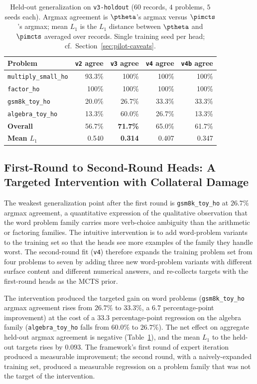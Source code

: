 \begin{table}[t]
\centering
\caption{Held-out generalization on \texttt{v3-holdout} ($60$ records,
$4$ problems, $5$ seeds each). Argmax agreement is $\ptheta$'s argmax
versus $\pimcts$'s argmax; mean $L_1$ is the $L_1$ distance between
$\ptheta$ and $\pimcts$ averaged over records. Single training seed
per head; cf.~Section~\ref{sec:pilot-caveats}.}
\label{tab:pilot-holdout}
\small
\begin{tabular}{@{}lrrrr@{}}
\toprule
Problem & \texttt{v2} agree & \texttt{v3} agree & \texttt{v4} agree & \texttt{v4b} agree \\
\midrule
\texttt{multiply\_small\_ho}  &  93.3\% & 100\%   & 100\%   & 100\%   \\
\texttt{factor\_ho}           & 100\%   & 100\%   & 100\%   & 100\%   \\
\texttt{gsm8k\_toy\_ho}       &  20.0\% &  26.7\% &  33.3\% &  33.3\% \\
\texttt{algebra\_toy\_ho}     &  13.3\% &  60.0\% &  26.7\% &  13.3\% \\
\midrule
\textbf{Overall}              & 56.7\%  & \textbf{71.7\%} & 65.0\%  & 61.7\%  \\
\textbf{Mean $L_1$}           & 0.540   & \textbf{0.314}  & 0.407   & 0.347   \\
\bottomrule
\end{tabular}
\end{table}

\subsection{First-Round to Second-Round Heads: A Targeted Intervention with Collateral Damage}
\label{sec:pilot-v3-v4}

The weakest generalization point after the first round is
\texttt{gsm8k\_toy\_ho} at $26.7\%$ argmax agreement, a quantitative
expression of the qualitative observation that the word problem
family carries more verb-choice ambiguity than the arithmetic or
factoring families. The intuitive intervention is to add word-problem
variants to the training set so that the heads see more examples of
the family they handle worst. The second-round fit (\texttt{v4})
therefore expands the training problem set from four problems to seven
by adding three new word-problem variants with different surface
content and different numerical answers, and re-collects targets with
the first-round heads as the MCTS prior.

The intervention produced the targeted gain on word problems
(\texttt{gsm8k\_toy\_ho} argmax agreement rises from $26.7\%$ to
$33.3\%$, a $6.7$ percentage-point improvement) at the cost of a
$33.3$ percentage-point regression on the algebra family
(\texttt{algebra\_toy\_ho} falls from $60.0\%$ to $26.7\%$). The net
effect on aggregate held-out argmax agreement is negative
(Table~\ref{tab:pilot-holdout}), and the mean $L_1$ to the held-out
targets rises by $0.093$. The framework's first round of expert
iteration produced a measurable improvement; the second round, with a
naively-expanded training set, produced a measurable regression on a
problem family that was not the target of the intervention.

